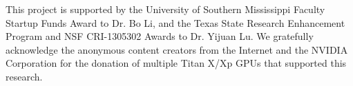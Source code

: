 \documentclass[../main.tex]{subfiles}
\begin{document}
This project is supported by the University of Southern
Mississippi Faculty Startup Funds Award to Dr. Bo Li, and
the Texas State Research Enhancement Program and NSF
CRI-1305302 Awards to Dr. Yijuan Lu. We gratefully acknowledge the anonymous content creators from the Internet and the NVIDIA Corporation for the donation of multiple Titan X/Xp GPUs that supported this research. 
\end{document}
